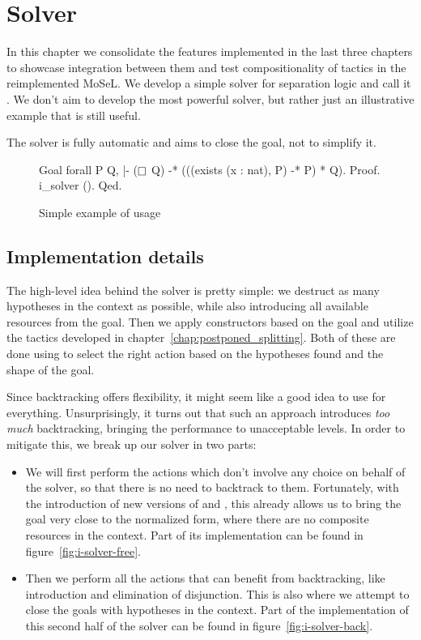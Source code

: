 \chapter{Solver}
\label{chap:solver}

In this chapter we consolidate the features implemented in the last three chapters to showcase integration between them and test compositionality of tactics in the reimplemented MoSeL.
We develop a simple solver for separation logic and call it .
We don't aim to develop the most powerful solver, but rather just an illustrative example that is still useful.

The solver is fully automatic and aims to close the goal, not to simplify it.

\begin{figure}[H]
\begin{coq}
Goal forall P Q, |- ($\mathop{\Box}$ Q) -* (((exists (x : nat), P) -* P) * Q).
Proof. i_solver (). Qed.
\end{coq}
  \caption{Simple example of  usage}
  \label{fig:i-solver-init-example}
\end{figure}

\section{Implementation details}
\label{sec:i-solver-implementation-idea}

The high-level idea behind the solver is pretty simple:
we destruct as many hypotheses in the context as possible, while also introducing all available resources from the goal.
Then we apply constructors based on the goal and utilize the tactics developed in chapter~\ref{chap:postponed_splitting}.
Both of these are done using  to select the right action based on the hypotheses found and the shape of the goal.

Since backtracking offers flexibility, it might seem like a good idea to use  for everything.
Unsurprisingly, it turns out that such an approach introduces \emph{too much} backtracking, bringing the performance to unacceptable levels.
In order to mitigate this, we break up our solver in two parts:
\begin{itemize}
\item We will first perform the actions which don't involve any choice on behalf of the solver, so that there is no need to backtrack to them.
  Fortunately, with the introduction of new versions of  and , this already allows us to bring the goal very close to the normalized form, where there are no composite resources in the context.
  Part of its implementation can be found in figure~\ref{fig:i-solver-free}.
\item Then we perform all the actions that can benefit from backtracking, like introduction and elimination of disjunction.
  This is also where we attempt to close the goals with hypotheses in the context.
  Part of the implementation of this second half of the solver can be found in figure~\ref{fig:i-solver-back}.
\end{itemize}

